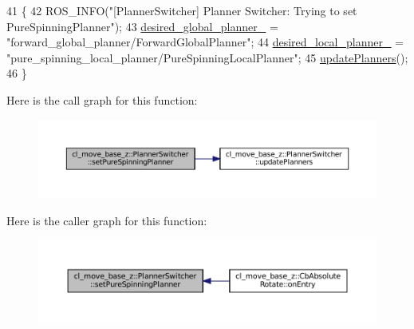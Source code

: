\begin{DoxyCode}
41 \{
42   ROS\_INFO(\textcolor{stringliteral}{"[PlannerSwitcher] Planner Switcher: Trying to set PureSpinningPlanner"});
43   \hyperlink{classcl__move__base__z_1_1PlannerSwitcher_aef047d3778b2993c1df146bbad43e03d}{desired\_global\_planner\_} = \textcolor{stringliteral}{"forward\_global\_planner/ForwardGlobalPlanner"};
44   \hyperlink{classcl__move__base__z_1_1PlannerSwitcher_a6cbf65f11bb69125f913caaabdf7b4cf}{desired\_local\_planner\_} = \textcolor{stringliteral}{"pure\_spinning\_local\_planner/PureSpinningLocalPlanner"};
45   \hyperlink{classcl__move__base__z_1_1PlannerSwitcher_a146641f63aea3185daab4c5cbb789550}{updatePlanners}();
46 \}
\end{DoxyCode}
Here is the call graph for this function\+:
\nopagebreak
\begin{figure}[H]
\begin{center}
\leavevmode
\includegraphics[width=350pt]{classcl__move__base__z_1_1PlannerSwitcher_a0accdff89d7858658c1835f06b53786f_cgraph}
\end{center}
\end{figure}
Here is the caller graph for this function\+:
\nopagebreak
\begin{figure}[H]
\begin{center}
\leavevmode
\includegraphics[width=350pt]{classcl__move__base__z_1_1PlannerSwitcher_a0accdff89d7858658c1835f06b53786f_icgraph}
\end{center}
\end{figure}
\mbox{\label{classcl__move__base__z_1_1PlannerSwitcher_a146641f63aea3185daab4c5cbb789550}} 
